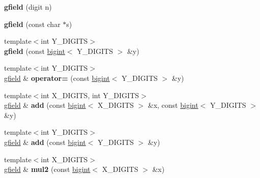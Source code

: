 \begin{DoxyCompactItemize}
\item 
\mbox{\label{structgfield_a7f4b59d395ef7a10002015cb14a18404}} 
{\bfseries gfield} (digit n)
\item 
\mbox{\label{structgfield_a284ffd2e552aa1b16ab8a497a2459819}} 
{\bfseries gfield} (const char $\ast$s)
\item 
\mbox{\label{structgfield_a3172d0ca3de822faeefc836387518840}} 
{\footnotesize template$<$int Y\+\_\+\+D\+I\+G\+I\+TS$>$ }\\{\bfseries gfield} (const \hyperlink{structbigint}{bigint}$<$ Y\+\_\+\+D\+I\+G\+I\+TS $>$ \&y)
\item 
\mbox{\label{structgfield_a9b0f4685fac80185136975c7db38ff1f}} 
{\footnotesize template$<$int Y\+\_\+\+D\+I\+G\+I\+TS$>$ }\\\hyperlink{structgfield}{gfield} \& {\bfseries operator=} (const \hyperlink{structbigint}{bigint}$<$ Y\+\_\+\+D\+I\+G\+I\+TS $>$ \&y)
\item 
\mbox{\label{structgfield_ac42fa6dc3ebec3ba7ae9143e363e8c06}} 
{\footnotesize template$<$int X\+\_\+\+D\+I\+G\+I\+TS, int Y\+\_\+\+D\+I\+G\+I\+TS$>$ }\\\hyperlink{structgfield}{gfield} \& {\bfseries add} (const \hyperlink{structbigint}{bigint}$<$ X\+\_\+\+D\+I\+G\+I\+TS $>$ \&x, const \hyperlink{structbigint}{bigint}$<$ Y\+\_\+\+D\+I\+G\+I\+TS $>$ \&y)
\item 
\mbox{\label{structgfield_a421446ca3f9e995438f49769ad28d58d}} 
{\footnotesize template$<$int Y\+\_\+\+D\+I\+G\+I\+TS$>$ }\\\hyperlink{structgfield}{gfield} \& {\bfseries add} (const \hyperlink{structbigint}{bigint}$<$ Y\+\_\+\+D\+I\+G\+I\+TS $>$ \&y)
\item 
\mbox{\label{structgfield_a11934c0293bd72b5010d7bd2b8f8a679}} 
{\footnotesize template$<$int X\+\_\+\+D\+I\+G\+I\+TS$>$ }\\\hyperlink{structgfield}{gfield} \& {\bfseries mul2} (const \hyperlink{structbigint}{bigint}$<$ X\+\_\+\+D\+I\+G\+I\+TS $>$ \&x)
\item 
\mbox{\label{structgfield_a4b1eb43a6d41cd9b405f19827965a3fb}} 

\end{DoxyCompactItemize}
